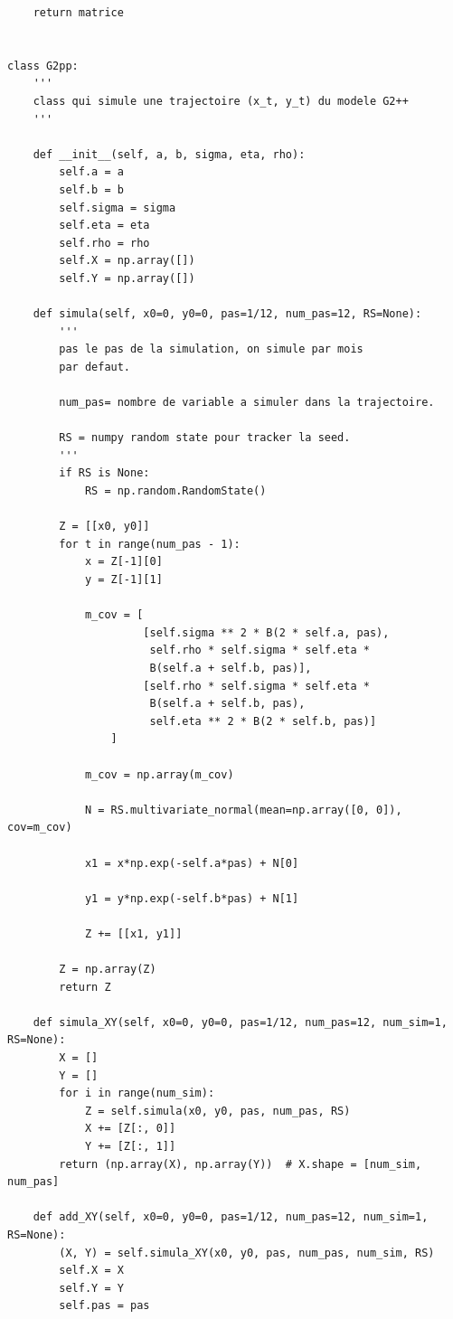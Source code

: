 \documentclass[12pt, a4paper]{book}
\begin{document}
{\begin{small}
\begin{verbatim}
    return matrice


class G2pp:
    '''
    class qui simule une trajectoire (x_t, y_t) du modele G2++
    '''

    def __init__(self, a, b, sigma, eta, rho):
        self.a = a
        self.b = b
        self.sigma = sigma
        self.eta = eta
        self.rho = rho
        self.X = np.array([])
        self.Y = np.array([])

    def simula(self, x0=0, y0=0, pas=1/12, num_pas=12, RS=None):
        '''
        pas le pas de la simulation, on simule par mois
        par defaut.

        num_pas= nombre de variable a simuler dans la trajectoire.

        RS = numpy random state pour tracker la seed.
        '''
        if RS is None:
            RS = np.random.RandomState()

        Z = [[x0, y0]]
        for t in range(num_pas - 1):
            x = Z[-1][0]
            y = Z[-1][1]

            m_cov = [
                     [self.sigma ** 2 * B(2 * self.a, pas),
                      self.rho * self.sigma * self.eta *
                      B(self.a + self.b, pas)],
                     [self.rho * self.sigma * self.eta *
                      B(self.a + self.b, pas),
                      self.eta ** 2 * B(2 * self.b, pas)]
                ]

            m_cov = np.array(m_cov)

            N = RS.multivariate_normal(mean=np.array([0, 0]), cov=m_cov)

            x1 = x*np.exp(-self.a*pas) + N[0]

            y1 = y*np.exp(-self.b*pas) + N[1]

            Z += [[x1, y1]]

        Z = np.array(Z)
        return Z

    def simula_XY(self, x0=0, y0=0, pas=1/12, num_pas=12, num_sim=1, RS=None):
        X = []
        Y = []
        for i in range(num_sim):
            Z = self.simula(x0, y0, pas, num_pas, RS)
            X += [Z[:, 0]]
            Y += [Z[:, 1]]
        return (np.array(X), np.array(Y))  # X.shape = [num_sim, num_pas]

    def add_XY(self, x0=0, y0=0, pas=1/12, num_pas=12, num_sim=1, RS=None):
        (X, Y) = self.simula_XY(x0, y0, pas, num_pas, num_sim, RS)
        self.X = X
        self.Y = Y
        self.pas = pas


\end{verbatim}
\end{small}}
\end{document}

